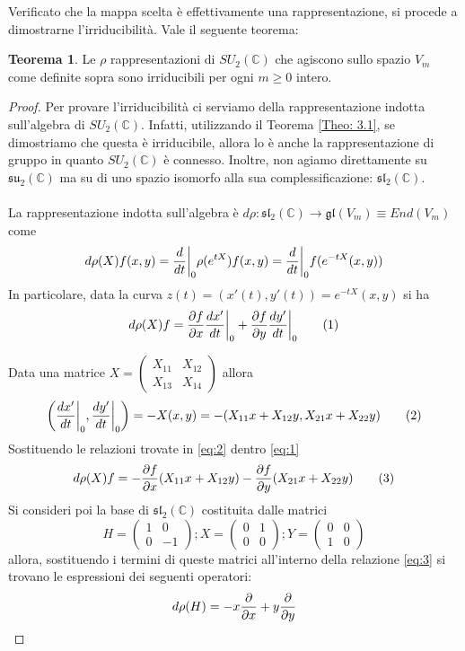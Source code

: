 \documentclass[12pt,a4paper]{report}
\theoremstyle{definition}
\theoremstyle{Theorem}
\newtheorem{Theo}[Def]{Teorema}
\theoremstyle{definition}
\theoremstyle{definition}
\theoremstyle{definition}
\begin{document}
Verificato che la mappa scelta è effettivamente una rappresentazione, si procede a dimostrarne l'irriducibilità. Vale il seguente teorema:
\begin{Theo} \label{Theo1}
	Le $\rho$ rappresentazioni di $SU_2(\mathbb{C})$ che agiscono sullo spazio $V_m$ come definite sopra sono irriducibili per ogni $m\geq 0$ intero.
\end{Theo}
\begin{proof}
	Per provare l'irriducibilità ci serviamo della rappresentazione indotta sull'algebra di $SU_2(\mathbb{C})$. Infatti, utilizzando il Teorema \ref{Theo: 3.1}, se dimostriamo che questa è irriducibile, allora lo è anche la rappresentazione di gruppo in quanto $SU_2(\mathbb{C})$ è connesso. Inoltre, non agiamo direttamente su $\mathfrak{su_2(\mathbb{C})}$ ma su di uno spazio isomorfo alla sua complessificazione: $\mathfrak{sl_2(\mathbb{C})}$.\\
	\\
	La rappresentazione indotta sull'algebra è $d\rho:\mathfrak{sl_2(\mathbb{C})}\rightarrow \mathfrak{gl}(V_m)\equiv End(V_m)$ come 
	$$d\rho(X)f(x,y)={d\over dt}\bigg{\rvert}_{0}\rho(e^{tX})f(x,y)={d\over dt}\bigg{\rvert}_{0}f(e^{-tX}(x,y))$$
	In particolare, data la curva $z(t)=(x'(t),y'(t))=e^{-tX}(x,y)$ si ha 
	\begin{equation}
		d\rho(X)f={\partial f\over \partial x}{dx'\over dt}\bigg{\rvert}_0+{\partial f\over \partial y}{dy'\over dt}\bigg{\rvert}_0 \label{eq:1} \tag{1}
	\end{equation}
	
	Data una matrice  
	$X=\begin{pmatrix}
		X_{11}&X_{12}\\
		X_{13}&X_{14}
	\end{pmatrix}$ allora 
\begin{equation}
	\bigg{(}{dx'\over dt}\bigg{\rvert}_0,{dy'\over dt}\bigg{\rvert}_0\bigg{)}=-X(x,y)=-(X_{11}x+X_{12}y,X_{21}x+X_{22}y)\label{eq:2} \tag{2}
\end{equation}
Sostituendo le relazioni trovate in \ref{eq:2} dentro \ref{eq:1}
\begin{equation}
d\rho(X)f=-{\partial f\over \partial x}(X_{11}x+X_{12}y)-{\partial f\over \partial y}(X_{21}x+X_{22}y) \label{eq:3} \tag{3}
\end{equation}
	Si consideri poi la base di $\mathfrak{sl_2(\mathbb{C})}$ costituita dalle matrici $$H=
	\begin{pmatrix}
		1&0\\
		0&-1
	\end{pmatrix}; 
	X=\begin{pmatrix}
		0&1\\
		0&0
	\end{pmatrix};
	Y=\begin{pmatrix}
		0&0\\
		1&0
	\end{pmatrix}$$ allora, sostituendo i termini di queste matrici all'interno della relazione \ref{eq:3} si trovano le espressioni dei seguenti operatori:
\begin{equation*}
	d\rho(H)=-x{\partial\over\partial x}+y{\partial\over\partial y}
\end{equation*}


\end{proof}
\end{document}
